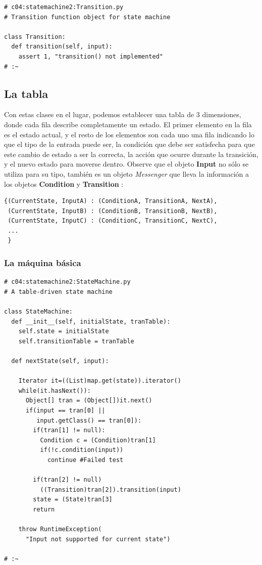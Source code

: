 \documentclass{article}
\begin{document}
\begin{lstlisting}
# c04:statemachine2:Transition.py 
# Transition function object for state machine 

class Transition: 
  def transition(self, input): 
    assert 1, "transition() not implemented" 
# :~ 
\end{lstlisting}

\subsection{La tabla}

Con estas clases en el lugar, podemos establecer una tabla de 3 dimensiones, donde cada fila describe completamente un estado. El primer elemento en la fila es el estado actual, y el resto de los elementos son cada uno una fila indicando lo que el tipo de la entrada puede ser, la condición que debe ser satisfecha para que este cambio de estado a ser la correcta, la acción que ocurre durante la transición, y el nuevo estado para moverse dentro. Observe que el objeto \textbf{Input} no sólo se utiliza para su tipo, también es un objeto \textit{Messenger} que lleva la información a los objetos \textbf{Condition} y \textbf{ Transition} :     \newline

\begin{lstlisting}
{(CurrentState, InputA) : (ConditionA, TransitionA, NextA), 
 (CurrentState, InputB) : (ConditionB, TransitionB, NextB), 
 (CurrentState, InputC) : (ConditionC, TransitionC, NextC), 
 ... 
 }
\end{lstlisting}

\subsubsection{La máquina básica}

\begin{lstlisting}
# c04:statemachine2:StateMachine.py 
# A table-driven state machine 

class StateMachine: 
  def __init__(self, initialState, tranTable): 
    self.state = initialState 
    self.transitionTable = tranTable 
    
  def nextState(self, input): 
  
    Iterator it=((List)map.get(state)).iterator() 
    while(it.hasNext()): 
      Object[] tran = (Object[])it.next() 
      if(input == tran[0] ||  
         input.getClass() == tran[0]): 
        if(tran[1] != null): 
          Condition c = (Condition)tran[1] 
          if(!c.condition(input)) 
            continue #Failed test
            
        if(tran[2] != null) 
          ((Transition)tran[2]).transition(input) 
        state = (State)tran[3] 
        return 
        
    throw RuntimeException( 
      "Input not supported for current state") 
      
# :~ 
\end{lstlisting}
\end{document}
